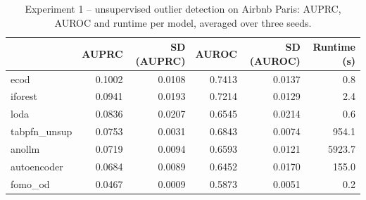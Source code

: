 \begin{table}
\centering
\caption{Experiment 1 -- unsupervised outlier detection on Airbnb Paris: AUPRC, AUROC and runtime per model, averaged over three seeds.}
\label{tab:exp1_airbnb_paris}
\begin{tabular}{lrrrrr}
\toprule
 & \bfseries AUPRC & \bfseries SD (AUPRC) & \bfseries AUROC & \bfseries SD (AUROC) & \bfseries Runtime (s) \\
\midrule
ecod & 0.1002 & 0.0108 & 0.7413 & 0.0137 & 0.8 \\
iforest & 0.0941 & 0.0193 & 0.7214 & 0.0129 & 2.4 \\
loda & 0.0836 & 0.0207 & 0.6545 & 0.0214 & 0.6 \\
tabpfn\_unsup & 0.0753 & 0.0031 & 0.6843 & 0.0074 & 954.1 \\
anollm & 0.0719 & 0.0094 & 0.6593 & 0.0121 & 5923.7 \\
autoencoder & 0.0684 & 0.0089 & 0.6452 & 0.0170 & 155.0 \\
fomo\_od & 0.0467 & 0.0009 & 0.5873 & 0.0051 & 0.2 \\
\bottomrule
\end{tabular}
\end{table}
